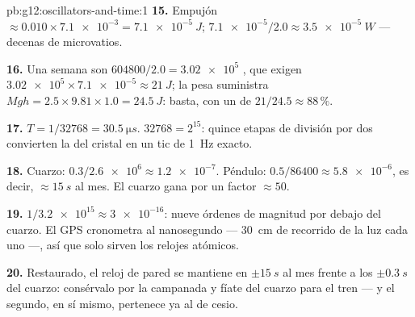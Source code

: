 \begin{solution}{pb:g12:oscillators-and-time:1}
\textbf{15.} Empujón $\approx 0.010 \times \num{7.1e-3} =
\qty{7.1e-5}{J}$;  $\num{7.1e-5}/2.0 \approx \qty{3.5e-5}{W}$
--- decenas de microvatios.

\textbf{16.} Una semana son $604800/2.0 = \num{3.02e5}$ , que
exigen $\num{3.02e5} \times \num{7.1e-5} \approx \qty{21}{J}$; la pesa
suministra $Mgh = 2.5 \times 9.81 \times 1.0 = \qty{24.5}{J}$: basta,
con un  de $21/24.5 \approx 88\,\%$.

\textbf{17.} $T = 1/\num{32768} = \qty{30.5}{\micro s}$.
$\num{32768} = 2^{15}$: quince etapas de división por dos convierten la
 del cristal en un tic de \qty{1}{Hz} exacto.

\textbf{18.} Cuarzo: $0.3/\num{2.6e6} \approx \num{1.2e-7}$. Péndulo:
$0.5/86400 \approx \num{5.8e-6}$, es decir, $\approx \qty{15}{s}$ al
mes. El cuarzo gana por un factor $\approx 50$.

\textbf{19.} $1/\num{3.2e15} \approx \num{3e-16}$: nueve órdenes de
magnitud por debajo del cuarzo. El GPS cronometra  al nanosegundo
--- \qty{30}{cm} de recorrido de la luz cada uno ---, así que solo
sirven los relojes atómicos.

\textbf{20.} Restaurado, el reloj de pared se mantiene en
$\pm\qty{15}{s}$ al mes frente a los $\pm\qty{0.3}{s}$ del cuarzo:
consérvalo por la campanada y fíate del cuarzo para el tren --- y el
segundo, en sí mismo, pertenece ya al  de cesio.
\end{solution}
